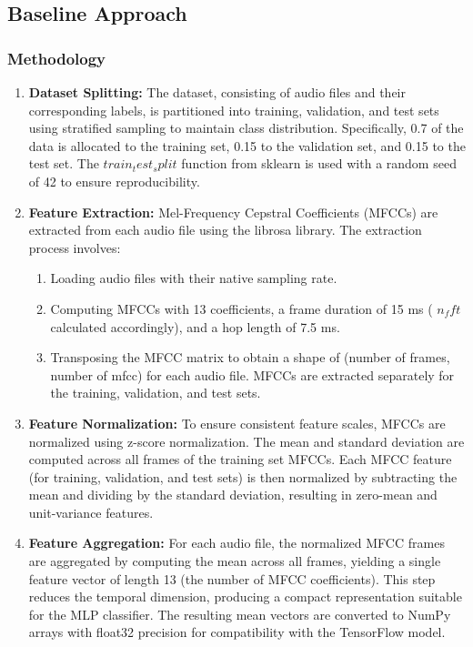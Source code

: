 \documentclass[12pt]{article}
\begin{document}
\subsection{Baseline Approach}
\subsubsection{Methodology}
\begin{enumerate}
    \item \textbf{Dataset Splitting:} The dataset, consisting of audio files and their corresponding labels, is partitioned into training, validation, and test sets using stratified sampling to maintain class distribution. Specifically, 0.7 of the data is allocated to the training set, 0.15 to the validation set, and 0.15 to the test set. The
    \(train_test_split\) function from sklearn is used with a random seed of 42 to ensure reproducibility.

    \item \textbf{Feature Extraction:} Mel-Frequency Cepstral Coefficients (MFCCs) are extracted from each audio file using the librosa library. The extraction process involves:

        \begin{enumerate}
            \item  Loading audio files with their native sampling rate.
            \item Computing MFCCs with 13 coefficients, a frame duration of 15 ms ( \(n_fft\) calculated accordingly), and a hop length of 7.5 ms.
            \item Transposing the MFCC matrix to obtain a shape of (number of frames, number of mfcc) for each audio file. MFCCs are extracted separately for the training, validation, and test sets.
        \end{enumerate}


    \item \textbf{Feature Normalization:} To ensure consistent feature scales, MFCCs are normalized using z-score normalization. The mean and standard deviation are computed across all frames of the training set MFCCs. Each MFCC feature (for training, validation, and test sets) is then normalized by subtracting the mean and dividing by the standard deviation, resulting in zero-mean and unit-variance features.

    \item \textbf{Feature Aggregation:} For each audio file, the normalized MFCC frames are aggregated by computing the mean across all frames, yielding a single feature vector of length 13 (the number of MFCC coefficients). This step reduces the temporal dimension, producing a compact representation suitable for the MLP classifier. The resulting mean vectors are converted to NumPy arrays with float32 precision for compatibility with the TensorFlow model.



\end{enumerate}
\end{document}
